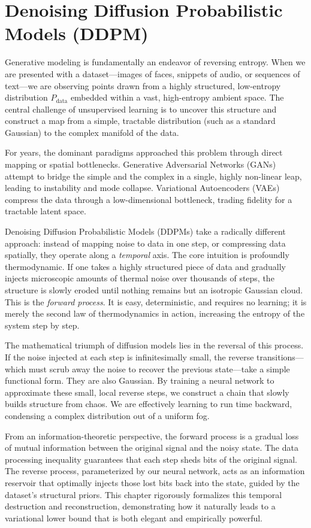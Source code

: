 \chapter{Denoising Diffusion Probabilistic Models (DDPM)}
\label{ch:ddpm}

Generative modeling is fundamentally an endeavor of reversing entropy. When we are presented with a dataset---images of faces, snippets of audio, or sequences of text---we are observing points drawn from a highly structured, low-entropy distribution $P_{\text{data}}$ embedded within a vast, high-entropy ambient space. The central challenge of unsupervised learning is to uncover this structure and construct a map from a simple, tractable distribution (such as a standard Gaussian) to the complex manifold of the data. 

For years, the dominant paradigms approached this problem through direct mapping or spatial bottlenecks. Generative Adversarial Networks (GANs) attempt to bridge the simple and the complex in a single, highly non-linear leap, leading to instability and mode collapse. Variational Autoencoders (VAEs) compress the data through a low-dimensional bottleneck, trading fidelity for a tractable latent space. 

Denoising Diffusion Probabilistic Models (DDPMs) take a radically different approach: instead of mapping noise to data in one step, or compressing data spatially, they operate along a \emph{temporal} axis. The core intuition is profoundly thermodynamic. If one takes a highly structured piece of data and gradually injects microscopic amounts of thermal noise over thousands of steps, the structure is slowly eroded until nothing remains but an isotropic Gaussian cloud. This is the \emph{forward process}. It is easy, deterministic, and requires no learning; it is merely the second law of thermodynamics in action, increasing the entropy of the system step by step.

The mathematical triumph of diffusion models lies in the reversal of this process. If the noise injected at each step is infinitesimally small, the reverse transitions---which must scrub away the noise to recover the previous state---take a simple functional form. They are also Gaussian. By training a neural network to approximate these small, local reverse steps, we construct a chain that slowly builds structure from chaos. We are effectively learning to run time backward, condensing a complex distribution out of a uniform fog. 

From an information-theoretic perspective, the forward process is a gradual loss of mutual information between the original signal and the noisy state. The data processing inequality guarantees that each step sheds bits of the original signal. The reverse process, parameterized by our neural network, acts as an information reservoir that optimally injects those lost bits back into the state, guided by the dataset's structural priors. This chapter rigorously formalizes this temporal destruction and reconstruction, demonstrating how it naturally leads to a variational lower bound that is both elegant and empirically powerful.

